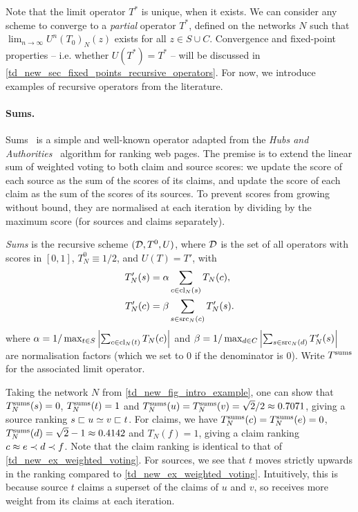 Note that the limit operator $T^*$ is unique, when it exists. We can consider
any scheme to converge to a \emph{partial} operator $T^*$, defined on the
networks $N$ such that $\lim_{n \to \infty}{U^n(T_0)_N(z)}$ exists for all $z
\in S \cup C$. Convergence and fixed-point properties -- i.e.  whether $U(T^*)
= T^*$ -- will be discussed in
\cref{td_new_sec_fixed_points_recursive_operators}. For now, we introduce
examples of recursive operators from the literature.

\paragraph{Sums.}

Sums~\cite{pasternack2010} is a simple and well-known operator adapted from the
\emph{Hubs and Authorities}~\cite{kleinberg1999} algorithm for ranking web
pages. The premise is to extend the linear sum of weighted voting to both claim
and source scores: we update the score of each source as the sum of the scores
of its claims, and update the score of each claim as the sum of the scores of
its sources. To prevent scores from growing without bound, they are normalised
at each iteration by dividing by the maximum score (for sources and claims
separately).

\begin{definition}
    \label{td_new_def_sums}
    \emph{Sums} is the recursive scheme $(\mathcal{D}, T^0, U)$, where $\mathcal{D}$ is the set
    of all operators with scores in $[0, 1]$, $T^0_N \equiv 1 / 2$, and $U(T) =
    T'$, with
    \begin{align*}
        T'_N(s) &=
            \alpha
            \sum_{c \in \operatorname{cl}_N(s)}{
                T_N(c)
            },
        \\
        T'_N(c) &=
            \beta
            \sum_{s \in \operatorname{src}_N(c)}{
                T'_N(s)
            }.
    \end{align*}
    where $
        \alpha = 1 / \max_{t \in S}{
            \left|
                \sum_{c \in \operatorname{cl}_N(t)}{
                    T_N(c)
                }
            \right|
        }
    $ and $
        \beta = 1 / \max_{d \in C}{
            \left|
                \sum_{s \in \operatorname{src}_N(d)}{
                    T'_N(s)
                }
            \right|
        }
    $ are normalisation factors (which we set to 0 if the denominator is 0).
    Write $T^{\operatorname{sums}}$ for the associated limit operator.
\end{definition}

Taking the network $N$ from \cref{td_new_fig_intro_example}, one can show that
$T^{\operatorname{sums}}_N(s) = 0$, $T^{\operatorname{sums}}_N(t) = 1$ and $T^{\operatorname{sums}}_N(u) = T^{\operatorname{sums}}_N(v) = \sqrt{2} / 2
\approx 0.7071$, giving a source ranking $s \sqsubset u \simeq v \sqsubset t$.  For claims,
we have $T^{\operatorname{sums}}_N(c) = T^{\operatorname{sums}}_N(e) = 0$, $T^{\operatorname{sums}}_N(d) = \sqrt{2} - 1 \approx
0.4142$ and $T_N(f) = 1$, giving a claim ranking $c \approx e \prec d \prec f$. Note
that the claim ranking is identical to that of
\cref{td_new_ex_weighted_voting}. For sources, we see that $t$ moves strictly
upwards in the ranking compared to \cref{td_new_ex_weighted_voting}.
Intuitively, this is because source $t$ claims a superset of the claims of $u$
and $v$, so receives more weight from its claims at each iteration.

